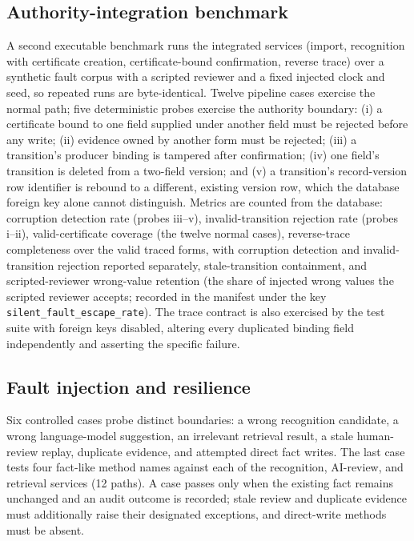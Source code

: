 \subsection{Authority-integration benchmark}
A second executable benchmark runs the integrated services (import, recognition with certificate creation, certificate-bound confirmation, reverse trace) over a synthetic fault corpus with a scripted reviewer and a fixed injected clock and seed, so repeated runs are byte-identical. Twelve pipeline cases exercise the normal path; five deterministic probes exercise the authority boundary: (i) a certificate bound to one field supplied under another field must be rejected before any write; (ii) evidence owned by another form must be rejected; (iii) a transition's producer binding is tampered after confirmation; (iv) one field's transition is deleted from a two-field version; and (v) a transition's record-version row identifier is rebound to a different, existing version row, which the database foreign key alone cannot distinguish. Metrics are counted from the database: corruption detection rate (probes iii--v), invalid-transition rejection rate (probes i--ii), valid-certificate coverage (the twelve normal cases), reverse-trace completeness over the valid traced forms, with corruption detection and invalid-transition rejection reported separately, stale-transition containment, and scripted-reviewer wrong-value retention (the share of injected wrong values the scripted reviewer accepts; recorded in the manifest under the key \texttt{silent\_fault\_escape\_rate}). The trace contract is also exercised by the test suite with foreign keys disabled, altering every duplicated binding field independently and asserting the specific failure.

\subsection{Fault injection and resilience}
Six controlled cases probe distinct boundaries: a wrong recognition candidate, a wrong language-model suggestion, an irrelevant retrieval result, a stale human-review replay, duplicate evidence, and attempted direct fact writes. The last case tests four fact-like method names against each of the recognition, AI-review, and retrieval services (12 paths). A case passes only when the existing fact remains unchanged and an audit outcome is recorded; stale review and duplicate evidence must additionally raise their designated exceptions, and direct-write methods must be absent.

